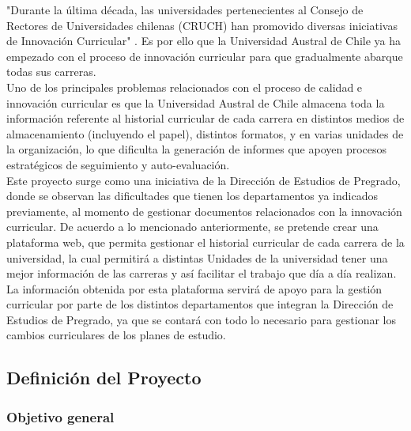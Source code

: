 	"Durante la última década, las universidades pertenecientes al Consejo de Rectores de Universidades chilenas (CRUCH) 
	han promovido diversas iniciativas de Innovación Curricular"\hspace{0.2cm} \cite{INN11}. Es por ello que la Universidad Austral de 
	Chile ya ha empezado con el proceso de innovación curricular para que gradualmente abarque todas sus carreras.
	\\
	
	Uno de los principales problemas relacionados con el proceso de calidad e innovación curricular es que la Universidad 
	Austral de Chile almacena toda la información referente al historial curricular de cada carrera en distintos medios 
	de almacenamiento (incluyendo el papel), distintos  formatos, y en varias unidades de la organización, lo que 
	dificulta la generación de informes que apoyen procesos estratégicos de seguimiento y auto-evaluación.
	\\
	
	Este proyecto surge como una iniciativa de la Dirección de Estudios de Pregrado, donde se observan las dificultades que tienen los 
	departamentos ya indicados previamente, al momento de gestionar documentos relacionados con la innovación curricular.  
	De acuerdo a lo mencionado anteriormente, se pretende crear una plataforma web, que permita gestionar el historial 
	curricular de cada carrera de la universidad, la cual permitirá a distintas Unidades de la universidad tener una 
	mejor información  de las carreras y así facilitar el trabajo que día a día realizan.
	\\
	
	La información obtenida por esta plataforma servirá de apoyo para la gestión curricular por parte de los distintos departamentos que integran la Dirección de Estudios de Pregrado, ya que se contará con todo lo necesario para gestionar los cambios curriculares de los planes de estudio.
	\\


	\subsection{Definición del Proyecto}
	
	\subsubsection{Objetivo general}
	
